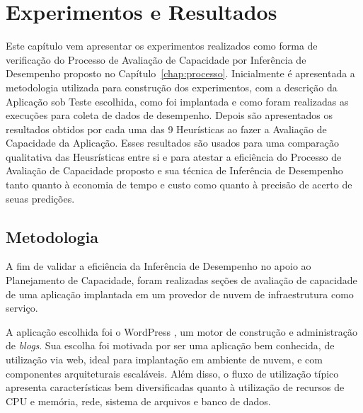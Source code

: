 \chapter{Experimentos e Resultados}
\label{chap:resultados}
Este capítulo vem apresentar os experimentos realizados como forma de
verificação do Processo de Avaliação de Capacidade por Inferência de 
Desempenho proposto no Capítulo~\ref{chap:processo}. Inicialmente é
apresentada a metodologia utilizada para construção dos experimentos, 
com a descrição da Aplicação sob Teste escolhida, como foi implantada e 
como foram realizadas as execuções para coleta de dados de desempenho. Depois
são apresentados os resultados obtidos por cada uma das 9 Heurísticas ao
fazer a Avaliação de Capacidade da Aplicação. Esses resultados são usados 
para uma comparação qualitativa das Heusrísticas entre si e para atestar
a eficiência do Processo de Avaliação de Capacidade proposto e sua técnica 
de Inferência de Desempenho tanto quanto à economia de tempo e custo como  
quanto à precisão de acerto de seuas predições.

\section{Metodologia}
\label{sec:resultados_metodologia}
A fim de validar a eficiência da Inferência de Desempenho no apoio
ao Planejamento de Capacidade, foram realizadas seções de avaliação de
capacidade de uma aplicação implantada em um provedor de nuvem de
infraestrutura como serviço.

A aplicação escolhida foi o WordPress \cite{wordpress}, um motor de construção 
e administração de \emph{blogs}. Sua escolha foi motivada por ser uma aplicação
bem conhecida, de utilização via web, ideal para implantação em ambiente de
nuvem, e com componentes arquiteturais escaláveis. Além disso, o fluxo de 
utilização típico apresenta características bem diversificadas quanto à utilização
de recursos de CPU e memória, rede, sistema de arquivos e banco de dados.  
